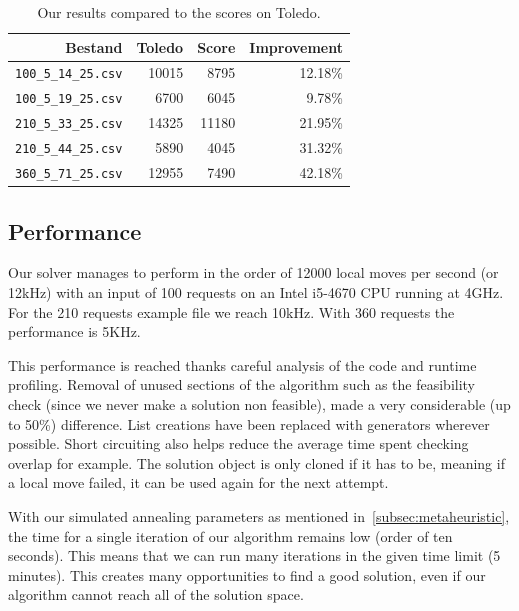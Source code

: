 \documentclass[11pt,a4paper]{article}
\begin{document}
    \begin{table}[ht]
        \centering
        \begin{tabular}{r|r|r|r}
            Bestand                     & Toledo  & Score & Improvement \\\hline
            \texttt{100\_5\_14\_25.csv} &  10015  &  8795 &    12.18\%  \\
            \texttt{100\_5\_19\_25.csv} &   6700  &  6045 &     9.78\%  \\
            \texttt{210\_5\_33\_25.csv} &  14325  & 11180 &    21.95\%  \\
            \texttt{210\_5\_44\_25.csv} &   5890  &  4045 &    31.32\%  \\
            \texttt{360\_5\_71\_25.csv} &  12955  &  7490 &    42.18\%  \\
        \end{tabular}
        \caption{Our results compared to the scores on Toledo.}
        \label{tab:results}
    \end{table}

    \subsection{Performance}\label{subsec:performance}
        Our solver manages to perform in the order of 12000 local moves per second (or 12kHz) with an input of 100 requests on an Intel i5-4670 CPU running at 4GHz.
        For the 210 requests example file we reach 10kHz. With 360 requests the performance is 5KHz.

        This performance is reached thanks careful analysis of the code and runtime profiling.
        Removal of unused sections of the algorithm such as the feasibility check (since we never make a solution non feasible), made a very considerable (up to 50\%) difference.
        List creations have been replaced with generators wherever possible.
        Short circuiting also helps reduce the average time spent checking overlap for example.
        The solution object is only cloned if it has to be, meaning if a local move failed, it can be used again for the next attempt.

        With our simulated annealing parameters as mentioned in~\ref{subsec:metaheuristic}, the time for a single iteration of our algorithm remains low (order of ten seconds).
        This means that we can run many iterations in the given time limit (5 minutes).
        This creates many opportunities to find a good solution, even if our algorithm cannot reach all of the solution space.
\end{document}
